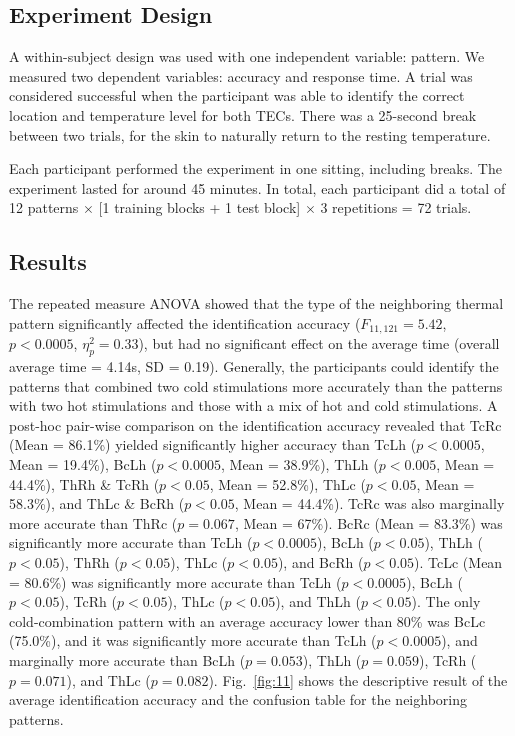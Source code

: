 \documentclass[preprint,12pt]{elsarticle}
\begin{document}
\subsection{Experiment Design}
A within-subject design was used with one independent variable: pattern. We measured two dependent variables: accuracy and response time. A trial was considered successful when the participant was able to identify the correct location and temperature level for both TECs. There was a 25-second break between two trials, for the skin to naturally return to the resting temperature.

Each participant performed the experiment in one sitting, including breaks. The experiment lasted for around 45 minutes. In total, each participant did a total of 12 patterns $\times$ [1 training blocks + 1 test block] $\times$ 3 repetitions = 72 trials.

\subsection{Results}
The repeated measure ANOVA showed that the type of the neighboring thermal pattern significantly affected the identification accuracy ($F_{11,121} = 5.42$, $p < 0.0005$, $\eta_p^2 = 0.33$), but had no significant effect on the average time (overall average time = 4.14s, SD = 0.19).
Generally, the participants could identify the patterns that combined two cold stimulations more accurately than the patterns with two hot stimulations and those with a mix of hot and cold stimulations.
A post-hoc pair-wise comparison on the identification accuracy revealed that TcRc (Mean = 86.1\%) yielded significantly higher accuracy than TcLh ($p < 0.0005$, Mean = 19.4\%), BcLh ($p < 0.0005$, Mean = 38.9\%), ThLh ($p < 0.005$, Mean = 44.4\%), ThRh \& TcRh ($p < 0.05$, Mean = 52.8\%), ThLc ($p < 0.05$, Mean = 58.3\%), and ThLc \& BcRh ($p < 0.05$, Mean = 44.4\%).
TcRc was also marginally more accurate than ThRc ($p = 0.067$, Mean = 67\%). BcRc (Mean = 83.3\%) was significantly more accurate than TcLh ($p < 0.0005$), BcLh ($p < 0.05$), ThLh ($p < 0.05$), ThRh ($p < 0.05$), ThLc ($p < 0.05$), and BcRh ($p < 0.05$). TcLc (Mean = 80.6\%) was significantly more accurate than TcLh ($p < 0.0005$), BcLh ($p < 0.05$), TcRh ($p < 0.05$), ThLc ($p < 0.05$), and ThLh ($p < 0.05$).
The only cold-combination pattern with an average accuracy lower than 80\% was BcLc (75.0\%), and it was significantly more accurate than TcLh ($p < 0.0005$), and marginally more accurate than BcLh ($p = 0.053$), ThLh ($p = 0.059$), TcRh ($p = 0.071$), and ThLc ($p = 0.082$).
Fig.~\ref{fig:11} shows the descriptive result of the average identification accuracy and the confusion table for the neighboring patterns.
\end{document}
